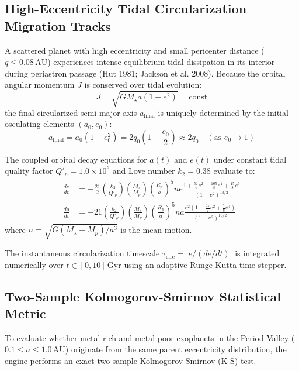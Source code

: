 \documentclass[11pt,a4paper]{article}
\begin{document}
\subsection{High-Eccentricity Tidal Circularization Migration Tracks}
A scattered planet with high eccentricity and small pericenter distance ($q \le 0.08\,\text{AU}$) experiences intense equilibrium tidal dissipation in its interior during periastron passage (Hut 1981; Jackson et al. 2008). Because the orbital angular momentum $J$ is conserved over tidal evolution:
\begin{equation}
J = \sqrt{G M_\star a (1 - e^2)} = \text{const}
\label{eq:j_conserved}
\end{equation}
the final circularized semi-major axis $a_{\text{final}}$ is uniquely determined by the initial osculating elements $(a_0, e_0)$:
\begin{equation}
a_{\text{final}} = a_0 \left(1 - e_0^2\right) = 2 q_0 \left(1 - \frac{e_0}{2}\right) \approx 2 q_0 \quad (\text{as } e_0 \to 1)
\label{eq:a_final}
\end{equation}

The coupled orbital decay equations for $a(t)$ and $e(t)$ under constant tidal quality factor $Q'_p = 1.0 \times 10^6$ and Love number $k_2 = 0.38$ evaluate to:
\begin{align}
\frac{de}{dt} &= -\frac{21}{2} \left(\frac{k_2}{Q'_p}\right) \left(\frac{M_\star}{M_p}\right) \left(\frac{R_p}{a}\right)^5 n e \frac{1 + \frac{57}{4}e^2 + \frac{105}{8}e^4 + \frac{15}{8}e^6}{\left(1 - e^2\right)^{13/2}} \label{eq:de_dt} \\
\frac{da}{dt} &= -21 \left(\frac{k_2}{Q'_p}\right) \left(\frac{M_\star}{M_p}\right) \left(\frac{R_p}{a}\right)^5 n a \frac{e^2 \left(1 + \frac{27}{2}e^2 + \frac{7}{8}e^4\right)}{\left(1 - e^2\right)^{15/2}} \label{eq:da_dt}
\end{align}
where $n = \sqrt{G (M_\star + M_p) / a^3}$ is the mean motion.

The instantaneous circularization timescale $\tau_{\text{circ}} = |e / (de/dt)|$ is integrated numerically over $t \in [0, 10]\,\text{Gyr}$ using an adaptive Runge-Kutta time-stepper.

\subsection{Two-Sample Kolmogorov-Smirnov Statistical Metric}
To evaluate whether metal-rich and metal-poor exoplanets in the Period Valley ($0.1 \le a \le 1.0\,\text{AU}$) originate from the same parent eccentricity distribution, the engine performs an exact two-sample Kolmogorov-Smirnov (K-S) test.
\end{document}
